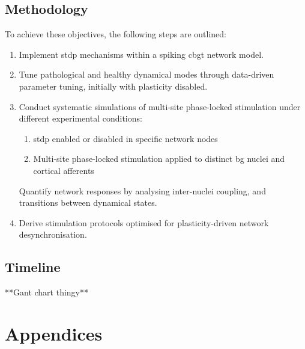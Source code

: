 \subsection{Methodology}
To achieve these objectives, the following steps are outlined:
\begin{enumerate}[nosep]
	\item Implement \acrshort{stdp} mechanisms within a spiking \acrshort{cbgt} network model.
	\item Tune pathological and healthy dynamical modes through data-driven parameter tuning, initially with plasticity disabled.
	\item Conduct systematic simulations of multi-site phase-locked stimulation under different experimental conditions:
	      \begin{enumerate}[nosep, label=\alph*.]
		      \item \acrshort{stdp} enabled or disabled in specific network nodes
		      \item Multi-site phase-locked stimulation applied to distinct \acrshort{bg} nuclei and cortical afferents
	      \end{enumerate}
	      Quantify network responses by analysing inter-nuclei coupling, and transitions between dynamical states.
	\item Derive stimulation protocols optimised for plasticity-driven network desynchronisation.
\end{enumerate}

\subsection{Timeline}
**Gant chart thingy**


\newpage


\newpage

\appendix
\section*{Appendices}
\renewcommand{\thesubsection}{\Alph{subsection}}
